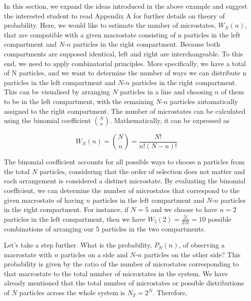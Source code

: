 \documentclass[12pt,a4paper]{report}
\newcommand{\esp}{\vspace{0.5cm}}
\begin{document}
In this section, we expand the ideas introduced in the above example and suggest the interested student to read Appendix A for further details on theory of probability. Here, we would like to estimate the number of microstates, $W_N(n)$, that are compatible with a given macrostate consisting of n particles in the left compartment and $N$-$n$ particles in the right compartment. Because both compartments are supposed identical, left and right are interchangeable. To this end, we need to apply combinatorial principles. More specifically, we have a total of N particles, and we want to determine the number of ways we can distribute n particles in the left compartment and $N$-$n$ particles in the right compartment. This can be visualised by arranging $N$ particles in a line and choosing $n$ of them to be in the left compartment, with the remaining $N$-$n$ particles automatically assigned to the right compartment. The number of microstates can be calculated using the binomial coefficient $\binom{N}{n}$. Mathematically, it can be expressed as

\begin{equation}
	W_N(n) = \binom{N}{n} = \frac{N!}{n!(N-n)!}
\end{equation}

The binomial coefficient accounts for all possible ways to choose n particles from the total $N$ particles, considering that the order of selection does not matter and each arrangement is considered a distinct microstate. By evaluating the binomial coefficient, we can determine the number of microstates that correspond to the given macrostate of having $n$ particles in the left compartment and $N$-$n$ particles in the right compartment. For instance, if $N = 5$ and we choose to have $n = 2$ particles in the left compartment, then we have $W_5(2)=\frac{5!}{2!3!}=10$ possible combinations of arranging our 5 particles in the two compartments.

\esp

Let’s take a step further. What is the probability, $P_N(n)$, of observing a macrostate with $n$ particles on a side and $N$-$n$ particles on the other side? This probability is given by the ratio of the number of microstates corresponding to that macrostate to the total number of microstates in the system. We have already mentioned that the total number of microstates or possible distributions of $N$ particles across the whole system is $N_T = 2^N$. Therefore,

\printbibliography[title={Bibliografía}]
\end{document}
